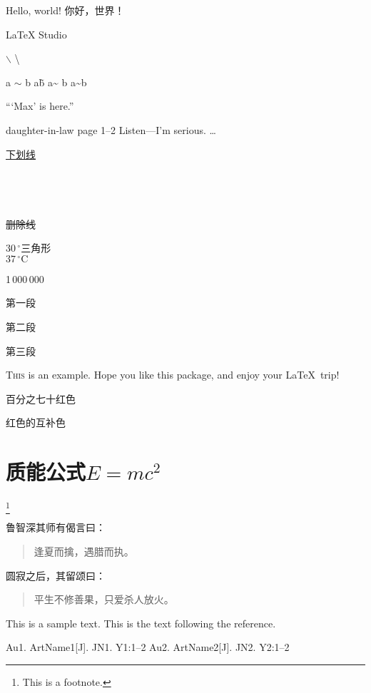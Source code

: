 \documentclass[a4paper, zihao = -4, linespread = 1]{ctexart}
\begin{document}
	Hello, world!
	你好，世界！

	\LaTeX{} Studio

	$\backslash$ \textbackslash \texttt{}

	a $\sim$ b
	a\~ b
	a\~{} b
	a\textasciitilde b

	``\thinspace `Max' is here.''

	daughter-in-law
	page 1--2
	Listen---I'm serious.
	\ldots %

	\uline{下划线} \\
	 \\
	 \\
	 \\
	 \\
	\sout{删除线} \\

	$30\,^{\circ}$三角形 \\
	$37\,^{\circ}\mathrm{C}$

	\mbox{1\,000\,000} %

	第一段

	\mbox{}

	第二段 \par
	第三段

	\setlength{\parskip}{0pt}

	\lettrine{T}{his} is an example. Hope you like this package, and enjoy your \LaTeX\ trip!

	{\color{red!70} 百分之七十红色} \par
	{\color{-red} 红色的互补色}

	\section{质能公式\texorpdfstring{$E=mc^2$}{E=mc\textasciicircum 2}}

	\footnote{This is a footnote.}

	鲁智深其师有偈言曰：
	\begin{quote}
	逢夏而擒，遇腊而执。
	\end{quote}
	圆寂之后，其留颂曰：
	\begin{quotation}
	平生不修善果，只爱杀人放火。
	\end{quotation}

	This is a sample text.\cite{author1.year1,author2.year2}
	This is the text following the reference.

	\begin{thebibliography}{99} %
		\addtolength{\itemsep}{-2ex} %
		Au1. ArtName1[J]. JN1. Y1:1--2
		Au2. ArtName2[J]. JN2. Y2:1--2
	\end{thebibliography}
\end{document}
